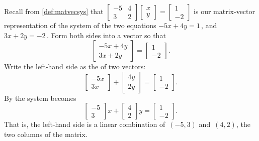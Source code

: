 \begin{example} 
Recall from \cref{def:matvecsys} that \(\begin{bmatrix} -5&4\\3&2 \end{bmatrix}\begin{bmatrix} x\\y \end{bmatrix}=\begin{bmatrix} 1\\-2 \end{bmatrix}\) is our matrix-vector representation of the system of the two equations \(-5x+4y=1\)\,, and \(3x+2y=-2\)\,. 
Form both sides into a vector so that
\begin{equation*}
\begin{bmatrix} -5x+4y\\3x+2y \end{bmatrix}
=\begin{bmatrix} 1\\-2 \end{bmatrix}.
\end{equation*}
Write the left-hand side as the  of two vectors:
\begin{equation*}
\begin{bmatrix} -5x\\3x \end{bmatrix}
+\begin{bmatrix} 4y\\2y \end{bmatrix}
=\begin{bmatrix} 1\\-2 \end{bmatrix}.
\end{equation*}
By  the system becomes
\begin{equation*}
\begin{bmatrix} -5\\3 \end{bmatrix}x
+\begin{bmatrix} 4\\2 \end{bmatrix}y
=\begin{bmatrix} 1\\-2 \end{bmatrix}.
\end{equation*}
That is, the left-hand side is a linear combination of~\((-5,3)\) and~\((4,2)\), the two columns of the matrix.
\end{example}

